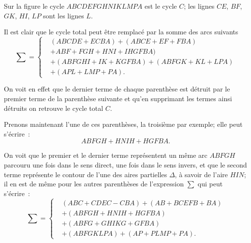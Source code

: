 \documentclass{article}
\begin{document}

Sur la figure le cycle $ABCDEFGHNIKLMPA$ est le cycle $C$; les lignes $CE$, $BF$, $GK$, $HI$, $LP$ sont les lignes $L$.


Il est clair que le cycle total peut être remplacé par la somme des arcs suivants
\[ \sum = \left\{ \begin{aligned} &(ABCDE + ECBA) + (ABCE + EF + FBA)\\ &+ ABF + FGH + HNI + IHGFBA)\\ &+ (ABFGHI + IK + KGFBA) + (ABFGK + KL + LPA)\\ &+ (APL + LMP + PA). \end{aligned} \right. \tag{4} \]

On voit en effet que le dernier terme de chaque parenthèse est détruit par le premier terme de la parenthèse suivante et qu'en supprimant les termes ainsi détruits on retrouve le cycle total $C$.

Prenons maintenant l'une de ces parenthèses, la troisième par exemple; elle peut s'écrire~:
\[ ABFGH + HNIH + HGFBA. \]

On voit que le premier et le dernier terme représentent un même arc $ABFGH$ parcouru une fois dans le sens direct, une fois dans le sens invers, et que le second terme représente le contour de l'une des aires partielles $\Delta$, à savoir de l'aire $HIN$; il en est de même pour les autres parenthèses de l'expression $\displaystyle\sum$ qui peut s'écrire~:
\[ \sum = \left\{ \begin{aligned} &(ABC + CDEC - CBA) + (AB + BCEFB + BA)\\ &+ (ABFGH + HNIH + HGFBA)\\ &+ (ABFG + GHIKG + GFBA)\\ &+ (ABFGKLPA) + (AP + PLMP + PA). \end{aligned} \right. \tag{5} \]
\end{document}
